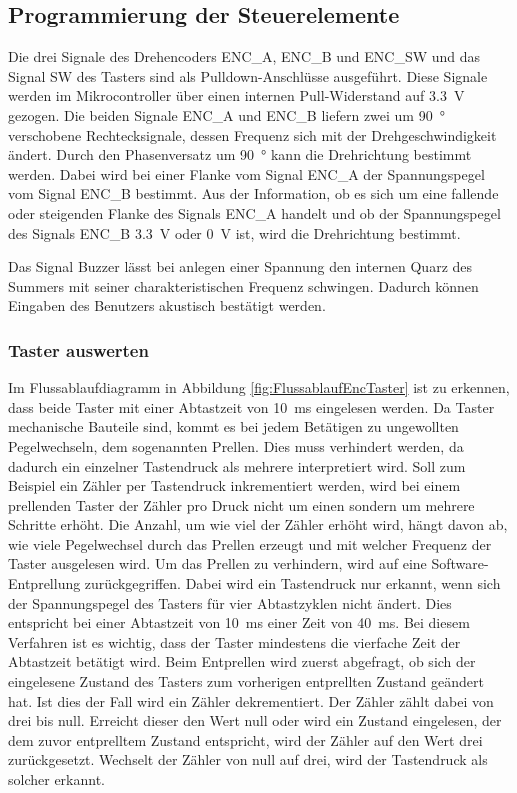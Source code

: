 \subsection{Programmierung der Steuerelemente}\label{Sec6Sub3}
Die drei Signale des Drehencoders ENC\_A, ENC\_B und ENC\_SW und das Signal SW des Tasters sind als Pulldown-Anschlüsse ausgeführt. Diese Signale werden im Mikrocontroller über einen internen Pull-Widerstand auf \SI{3,3}{\volt} gezogen. Die beiden Signale ENC\_A und ENC\_B liefern zwei um \SI{90}{\degree} verschobene Rechtecksignale, dessen Frequenz sich mit der Drehgeschwindigkeit ändert. Durch den Phasenversatz um \SI{90}{\degree} kann die Drehrichtung bestimmt werden. Dabei wird bei einer Flanke vom Signal \glqq ENC\_A\grqq{} der Spannungspegel vom Signal \glqq ENC\_B \grqq{} bestimmt. Aus der Information, ob es sich um eine fallende oder steigenden Flanke des Signals ENC\_A handelt und ob der Spannungspegel des Signals ENC\_B \SI{3,3}{\volt} oder \SI{0}{\volt} ist, wird die Drehrichtung bestimmt.\vspace{11pt}

Das Signal Buzzer lässt bei anlegen einer Spannung den internen Quarz des Summers mit seiner charakteristischen Frequenz schwingen. Dadurch können Eingaben des Benutzers akustisch bestätigt werden.

\subsubsection{Taster auswerten}\label{sec:Taster}
Im Flussablaufdiagramm in Abbildung \ref{fig:FlussablaufEncTaster} ist zu erkennen, dass beide Taster mit einer Abtastzeit von \SI{10}{\milli\second} eingelesen werden. Da Taster mechanische Bauteile sind, kommt es bei jedem Betätigen zu ungewollten Pegelwechseln, dem sogenannten Prellen. Dies muss verhindert werden, da dadurch ein einzelner Tastendruck als mehrere interpretiert wird. Soll zum Beispiel ein Zähler per Tastendruck inkrementiert werden, wird bei einem prellenden Taster der Zähler pro Druck nicht um einen sondern um mehrere Schritte erhöht. Die Anzahl, um wie viel der Zähler erhöht wird, hängt davon ab, wie viele Pegelwechsel durch das Prellen erzeugt und mit welcher Frequenz der Taster ausgelesen wird. Um das Prellen zu verhindern, wird auf eine Software-Entprellung zurückgegriffen. Dabei wird ein Tastendruck nur erkannt, wenn sich der Spannungspegel des Tasters für vier Abtastzyklen nicht ändert. Dies entspricht bei einer Abtastzeit von \SI{10}{\milli\second} einer Zeit von \SI{40}{\milli\second}. Bei diesem Verfahren ist es wichtig, dass der Taster mindestens die vierfache Zeit der Abtastzeit betätigt wird. Beim Entprellen wird zuerst abgefragt, ob sich der eingelesene Zustand des Tasters zum vorherigen entprellten Zustand geändert hat. Ist dies der Fall wird ein Zähler dekrementiert. Der Zähler zählt dabei von drei bis null. Erreicht dieser den Wert null oder wird ein Zustand eingelesen, der dem zuvor entprelltem Zustand entspricht, wird der Zähler auf den Wert drei zurückgesetzt. Wechselt der Zähler von null auf drei, wird der Tastendruck als solcher erkannt.\vspace{11pt}

